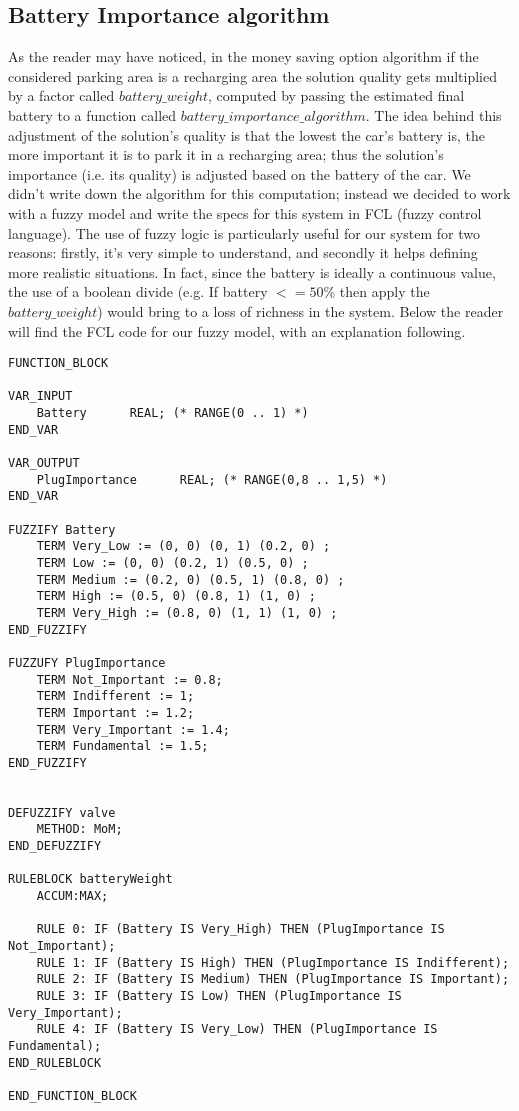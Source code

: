 \subsection{Battery Importance algorithm}
As the reader may have noticed, in the money saving option algorithm if the considered parking area is a recharging area the solution quality gets multiplied by a factor called $battery\_weight$, computed by passing the estimated final battery to a function called $battery\_importance\_algorithm$. 
The idea behind this adjustment of the solution's quality is that the lowest the car's battery is, the more important it is to park it in a recharging area; thus the solution's importance (i.e. its quality) is adjusted based on the battery of the car. 
We didn't write down the algorithm for this computation; instead we decided to work with a fuzzy model and write the specs for this system in FCL (fuzzy control language). The use of fuzzy logic is particularly useful for our system for two reasons: firstly, it's very simple to understand, and secondly it helps defining more realistic situations. In fact, since the battery is ideally a continuous value, the use of a boolean divide (e.g. If battery $<=50\%$ then apply the $battery\_weight$) would bring to a loss of richness in the system.
Below the reader will find the FCL code for our fuzzy model, with an explanation following.


\begin{verbatim}
FUNCTION_BLOCK

VAR_INPUT
    Battery      REAL; (* RANGE(0 .. 1) *) 
END_VAR

VAR_OUTPUT
    PlugImportance      REAL; (* RANGE(0,8 .. 1,5) *) 
END_VAR

FUZZIFY Battery
    TERM Very_Low := (0, 0) (0, 1) (0.2, 0) ;
    TERM Low := (0, 0) (0.2, 1) (0.5, 0) ;
    TERM Medium := (0.2, 0) (0.5, 1) (0.8, 0) ;
    TERM High := (0.5, 0) (0.8, 1) (1, 0) ;
    TERM Very_High := (0.8, 0) (1, 1) (1, 0) ;
END_FUZZIFY

FUZZUFY PlugImportance
    TERM Not_Important := 0.8;
    TERM Indifferent := 1;
    TERM Important := 1.2;
    TERM Very_Important := 1.4;
    TERM Fundamental := 1.5;
END_FUZZIFY


DEFUZZIFY valve 
    METHOD: MoM;
END_DEFUZZIFY

RULEBLOCK batteryWeight
    ACCUM:MAX;

    RULE 0: IF (Battery IS Very_High) THEN (PlugImportance IS Not_Important);
    RULE 1: IF (Battery IS High) THEN (PlugImportance IS Indifferent);
    RULE 2: IF (Battery IS Medium) THEN (PlugImportance IS Important);
    RULE 3: IF (Battery IS Low) THEN (PlugImportance IS Very_Important);
    RULE 4: IF (Battery IS Very_Low) THEN (PlugImportance IS Fundamental);
END_RULEBLOCK

END_FUNCTION_BLOCK
\end{verbatim}


